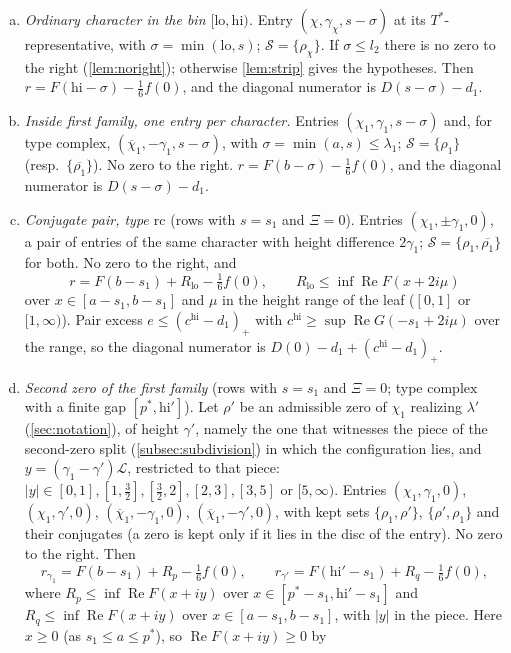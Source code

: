 \documentclass[11pt]{amsart}
\numberwithin{equation}{section}
\theoremstyle{plain}
\theoremstyle{definition}
\theoremstyle{remark}
\newcommand{\LL}{\mathcal{L}}
\renewcommand{\Re}{\operatorname{Re}}
\newcommand{\cS}{\mathcal{S}}
\newcommand{\lo}{\mathrm{lo}}
\newcommand{\hi}{\mathrm{hi}}
\newcommand{\1}{\mathbf{1}}
\newcommand{\bchi}{\overline{\chi}}
\begin{document}
\begin{enumerate}[(a)]
  \item \emph{Ordinary character in the bin $[\lo,\hi)$.} Entry $(\chi,\gamma_\chi,s-\sigma)$ at its
    $T^*$-representative, with $\sigma=\min(\lo,s)$; $\cS=\{\rho_\chi\}$. If $\sigma\le l_2$ there is no
    zero to the right (\cref{lem:noright}); otherwise \cref{lem:strip} gives the hypotheses. Then
    $r=F(\hi-\sigma)-\frac16f(0)$, and the diagonal numerator is $D(s-\sigma)-d_1$.
  \item \emph{Inside first family, one entry per character.} Entries $(\chi_1,\gamma_1,s-\sigma)$ and, for
    type $\mathrm{complex}$, $(\bchi_1,-\gamma_1,s-\sigma)$, with $\sigma=\min(a,s)\le\lambda_1$; $\cS=\{\rho_1\}$
    (resp.\ $\{\overline{\rho_1}\}$). No zero to the right. $r=F(b-\sigma)-\frac16f(0)$, and the diagonal
    numerator is $D(s-\sigma)-d_1$.
  \item \emph{Conjugate pair, type $\mathrm{rc}$} (rows with $s=s_1$ and $\Xi=0$). Entries
    $(\chi_1,\pm\gamma_1,0)$, a pair of entries of the same character with height difference
    $2\gamma_1$; $\cS=\{\rho_1,\overline{\rho_1}\}$ for both. No zero to the right, and
    \[
      r=F(b-s_1)+R_{\lo}-\tfrac16f(0),\qquad R_{\lo}\le\inf\Re F(x+2i\mu)
    \]
    over $x\in[a-s_1,b-s_1]$ and $\mu$ in the height range of the leaf ($[0,1]$ or $[1,\infty)$). Pair
    excess $e\le(c^{\hi}-d_1)_+$ with $c^{\hi}\ge\sup\Re G(-s_1+2i\mu)$ over the range, so the diagonal numerator
    is $D(0)-d_1+(c^{\hi}-d_1)_+$.
  \item \emph{Second zero of the first family} (rows with $s=s_1$ and $\Xi=0$; type $\mathrm{complex}$
    with a finite gap $[p^*,\hi']$). Let $\rho'$ be an admissible zero of $\chi_1$ realizing $\lambda'$
    (\cref{sec:notation}), of height $\gamma'$, namely the one that witnesses the piece of the second-zero split
    (\cref{subsec:subdivision}) in which the configuration lies, and $y=(\gamma_1-\gamma')\LL$, restricted to that
    piece: $|y|\in[0,1],[1,\frac32],[\frac32,2],[2,3],[3,5]$ or $[5,\infty)$.
    Entries $(\chi_1,\gamma_1,0)$, $(\chi_1,\gamma',0)$, $(\bchi_1,-\gamma_1,0)$, $(\bchi_1,-\gamma',0)$, with kept sets
    $\{\rho_1,\rho'\}$, $\{\rho',\rho_1\}$ and their conjugates (a zero is kept only if it lies in the
    disc of the entry). No zero to the right. Then
    \[
      r_{\gamma_1}=F(b-s_1)+R_p-\tfrac16f(0),\qquad r_{\gamma'}=F(\hi'-s_1)+R_q-\tfrac16f(0),
    \]
    where $R_p\le\inf\Re F(x+iy)$ over $x\in[p^*-s_1,\hi'-s_1]$ and $R_q\le\inf\Re F(x+iy)$ over
    $x\in[a-s_1,b-s_1]$, with $|y|$ in the piece. Here $x\ge0$ (as $s_1\le a\le p^*$), so $\Re F(x+iy)\ge0$ by

\end{enumerate}
\end{document}
